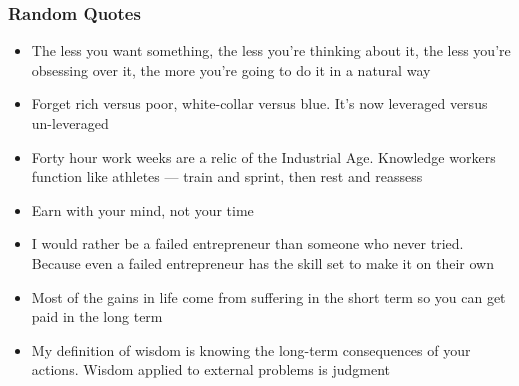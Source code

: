 \begin{frame}[fragile]\frametitle{ Random Quotes}

\begin{itemize}
\item The less you want something, the less you’re thinking about it, the less you’re obsessing over it, the more you’re going to do it in a natural way
 
\item Forget rich versus poor, white-collar versus blue. It’s now leveraged versus un-leveraged
 
\item Forty hour work weeks are a relic of the Industrial Age. Knowledge workers function like athletes — train and sprint, then rest and reassess
 
\item Earn with your mind, not your time
 
\item I would rather be a failed entrepreneur than someone who never tried. Because even a failed entrepreneur has the skill set to make it on their own
 
\item Most of the gains in life come from suffering in the short term so you can get paid in the long term
 
\item My definition of wisdom is knowing the long-term consequences of your actions. Wisdom applied to external problems is judgment
\end{itemize}

\end{frame}